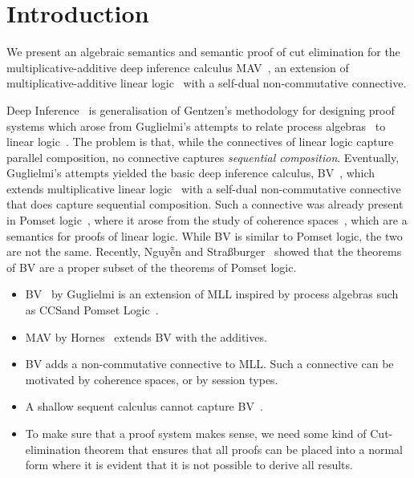 \section{Introduction}\label{sec:introduction}

We present an algebraic semantics and semantic proof of cut elimination for the multiplicative-additive deep inference calculus MAV~\cite{Horne15:mav}, an extension of multiplicative-additive linear logic~\cite[MALL]{Girard87:ll} with a self-dual non-commutative connective.

Deep Inference~\cite{Guglielmi14:di} is generalisation of Gentzen's methodology for designing proof systems which arose from Guglielmi's attempts to relate process algebras~\cite[CCS]{Milner89:CC,Milner80:CCS} to linear logic~\cite{Girard87:ll}.
The problem is that, while the connectives of linear logic capture parallel composition, no connective captures \emph{sequential composition}.
Eventually, Guglielmi's attempts yielded the basic deep inference calculus, BV~\cite{Guglielmi99:bv,Guglielmi07:sis}, which extends multiplicative linear logic~\cite[MLL]{Girard87:ll} with a self-dual non-commutative connective that does capture sequential composition.
Such a connective was already present in Pomset logic~\cite{Retore97:pomset}, where it arose from the study of coherence spaces~\cite[Chapter 8]{GirardTL89:proofs}, which are a semantics for proofs of linear logic.
While BV is similar to Pomset logic, the two are not the same. Recently, Nguyễn and Stra{\ss}burger~\cite{NguyenS22:bvisnotpl} showed that the theorems of BV are a proper subset of the theorems of Pomset logic.


\begin{itemize}
      \item BV~\cite{Guglielmi07:sis} by Guglielmi is an extension of MLL inspired by process algebras such as CCSand Pomset Logic~\cite{Retore97:pomset}.
      \item MAV by Hornes~\cite{Horne15:mav} extends BV with the additives.
      \item BV adds a non-commutative connective to MLL. Such a connective can be motivated by coherence spaces, or by session types.
      \item A shallow sequent calculus cannot capture BV~\cite{Tiu06:sisii}.
      \item To make sure that a proof system makes sense, we need some kind
            of Cut-elimination theorem that ensures that all proofs can be
            placed into a normal form where it is evident that it is not
            possible to derive all results.
\end{itemize}

